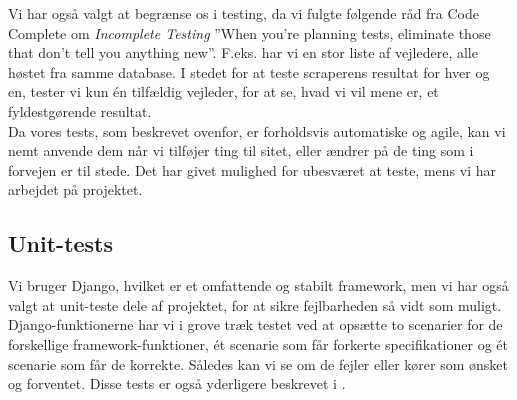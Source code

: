 \documentclass[12pt]{article}
\begin{document}
Vi har også valgt at begrænse os i testing, da vi fulgte følgende råd fra Code Complete\cite{cc} om \textit{Incomplete Testing} ''When you're planning tests, eliminate those that don't tell you anything new''. F.eks. har vi en stor liste af vejledere, alle høstet fra samme database. I stedet for at teste scraperens resultat for hver og en, tester vi kun én tilfældig vejleder, for at se, hvad vi vil mene er, et fyldestgørende resultat. \\
Da vores tests, som beskrevet ovenfor, er forholdsvis automatiske og agile, kan vi nemt anvende dem når vi tilføjer ting til sitet, eller ændrer på de ting som i forvejen er til stede. Det har givet mulighed for ubesværet at teste, mens vi har arbejdet på projektet. \\

\subsection{Unit-tests}
Vi bruger Django, hvilket er et omfattende og stabilt framework, men vi har også valgt at unit-teste dele af projektet, for at sikre fejlbarheden så vidt som muligt. Django-funktionerne har vi i grove træk testet ved at opsætte to scenarier for de forskellige framework-funktioner, ét scenarie som får forkerte specifikationer og ét scenarie som får de korrekte. Således kan vi se om de fejler eller kører som ønsket og forventet. Disse tests er også yderligere beskrevet i .
\end{document}
